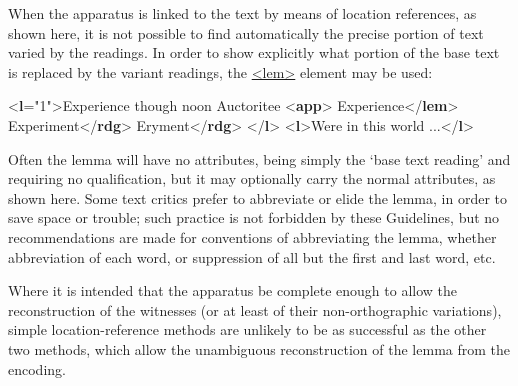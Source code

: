 When the apparatus is linked to the text by means of location references, as shown here, it is not possible to find automatically the precise portion of text varied by the readings. In order to show explicitly what portion of the base text is replaced by the variant readings, the \hyperref[TEI.lem]{<lem>} element may be used: \par\bgroup{}\exampleFont \begin{shaded}\noindent\mbox{}{<\textbf{l}\hspace*{1em}{n}="{1}">}Experience though noon Auctoritee\mbox{}\newline 
{<\textbf{app}>}\mbox{}\newline 
\hspace*{1em}Experience{</\textbf{lem}>}\mbox{}\newline 
\hspace*{1em}Experiment{</\textbf{rdg}>}\mbox{}\newline 
\hspace*{1em}Eryment{</\textbf{rdg}>}\mbox{}\newline 
{}\mbox{}\newline 
{</\textbf{l}>}\mbox{}\newline 
{<\textbf{l}>}Were in this world ...{</\textbf{l}>}\end{shaded}\egroup\par \noindent  Often the lemma will have no attributes, being simply the ‘base text reading’ and requiring no qualification, but it may optionally carry the normal attributes, as shown here. Some text critics prefer to abbreviate or elide the lemma, in order to save space or trouble; such practice is not forbidden by these Guidelines, but no recommendations are made for conventions of abbreviating the lemma, whether abbreviation of each word, or suppression of all but the first and last word, etc.\par
Where it is intended that the apparatus be complete enough to allow the reconstruction of the witnesses (or at least of their non-orthographic variations), simple location-reference methods are unlikely to be as successful as the other two methods, which allow the unambiguous reconstruction of the lemma from the encoding.

